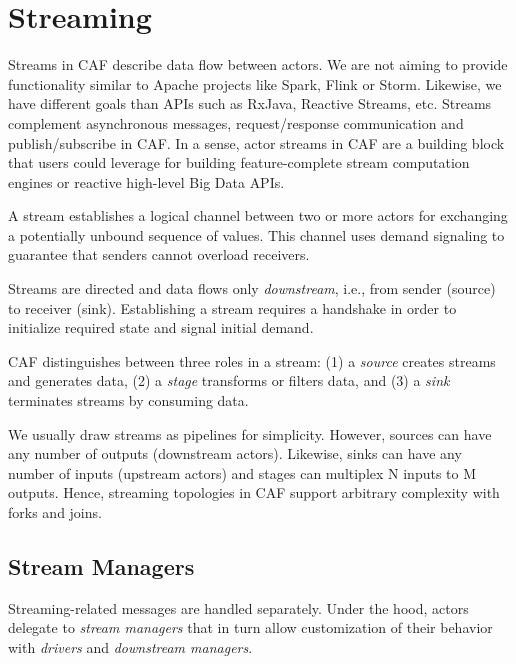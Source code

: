 \section{Streaming\experimental}
\label{streaming}

Streams in CAF describe data flow between actors. We are not aiming to provide
functionality similar to Apache projects like Spark, Flink or Storm. Likewise,
we have different goals than APIs such as RxJava, Reactive Streams, etc.
Streams complement asynchronous messages, request/response communication and
publish/subscribe in CAF. In a sense, actor streams in CAF are a building
block that users could leverage for building feature-complete stream
computation engines or reactive high-level Big Data APIs.

A stream establishes a logical channel between two or more actors for
exchanging a potentially unbound sequence of values. This channel uses demand
signaling to guarantee that senders cannot overload receivers.


Streams are directed and data flows only \emph{downstream}, i.e., from sender
(source) to receiver (sink). Establishing a stream requires a handshake in
order to initialize required state and signal initial demand.


CAF distinguishes between three roles in a stream: (1) a \emph{source} creates
streams and generates data, (2) a \emph{stage} transforms or filters data, and
(3) a \emph{sink} terminates streams by consuming data.

We usually draw streams as pipelines for simplicity. However, sources can have
any number of outputs (downstream actors). Likewise, sinks can have any number
of inputs (upstream actors) and stages can multiplex N inputs to M outputs.
Hence, streaming topologies in CAF support arbitrary complexity with forks and
joins.

\subsection{Stream Managers}

Streaming-related messages are handled separately. Under the hood, actors
delegate to \emph{stream managers} that in turn allow customization of their
behavior with \emph{drivers} and \emph{downstream managers}.


